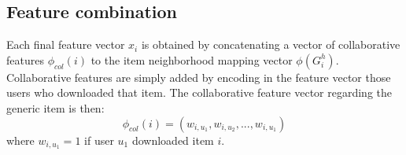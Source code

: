 %

\subsection{Feature combination}
Each final feature vector $x_i$ is obtained by concatenating a vector of collaborative features $\phi_{col}(i)$ to the item neighborhood mapping vector $\phi(G^h_i)$. Collaborative features are simply added by encoding in the feature vector those users who downloaded that item. The collaborative feature vector regarding the generic item is then:
\[
\phi_{col}(i)=(w_{i,u_1}, w_{i,u_2},...,w_{i,u_1})
\]
where $w_{i,u_1}=1$ if user $u_1$ downloaded item $i$.

